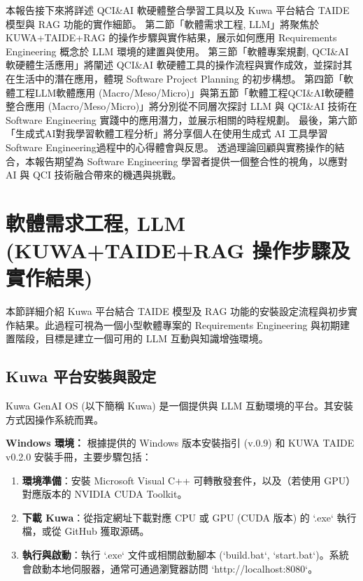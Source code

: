 \documentclass[twocolumn,11pt,a4paper]{article}
\begin{document}
本報告接下來將詳述 QCI\&AI 軟硬體整合學習工具以及 Kuwa 平台結合 TAIDE\cite{llama_taide} 模型與 RAG 功能的實作細節。
第二節「軟體需求工程, LLM」將聚焦於 KUWA+TAIDE+RAG 的操作步驟與實作結果，展示如何應用 Requirements Engineering 概念於 LLM 環境的建置與使用。
第三節「軟體專案規劃, QCI\&AI軟硬體生活應用」將闡述 QCI\&AI 軟硬體工具的操作流程與實作成效，並探討其在生活中的潛在應用，體現 Software Project Planning 的初步構想。
第四節「軟體工程LLM軟體應用 (Macro/Meso/Micro)」與第五節「軟體工程QCI\&AI軟硬體整合應用 (Macro/Meso/Micro)」將分別從不同層次探討 LLM 與 QCI\&AI 技術在 Software Engineering 實踐中的應用潛力，並展示相關的時程規劃。
最後，第六節「生成式AI對我學習軟體工程分析」將分享個人在使用生成式 AI 工具學習 Software Engineering過程中的心得體會與反思。
透過理論回顧與實務操作的結合，本報告期望為 Software Engineering 學習者提供一個整合性的視角，以應對 AI 與 QCI 技術融合帶來的機遇與挑戰。

\section{軟體需求工程, LLM (KUWA+TAIDE+RAG 操作步驟及實作結果)}
本節詳細介紹 Kuwa 平台結合 TAIDE 模型及 RAG 功能的安裝設定流程與初步實作結果。此過程可視為一個小型軟體專案的 Requirements Engineering 與初期建置階段，目標是建立一個可用的 LLM 互動與知識增強環境。

\subsection{Kuwa 平台安裝與設定}
Kuwa GenAI OS (以下簡稱 Kuwa) 是一個提供與 LLM 互動環境的平台。其安裝方式因操作系統而異。

\textbf{Windows 環境：} %
根據提供的 Windows 版本安裝指引 (v.0.9) 和 KUWA TAIDE v0.2.0 安裝手冊，主要步驟包括：
\begin{enumerate}[noitemsep, topsep=0pt]
    \item \textbf{環境準備}：安裝 Microsoft Visual C++ 可轉散發套件，以及（若使用 GPU）對應版本的 NVIDIA CUDA Toolkit。
    \item \textbf{下載 Kuwa}：從指定網址下載對應 CPU 或 GPU (CUDA 版本) 的 `.exe` 執行檔，或從 GitHub 獲取源碼。
    \item \textbf{執行與啟動}：執行 `.exe` 文件或相關啟動腳本 (`build.bat`, `start.bat`)。系統會啟動本地伺服器，通常可通過瀏覽器訪問 `http://localhost:8080`。
\end{enumerate}
\end{document}
